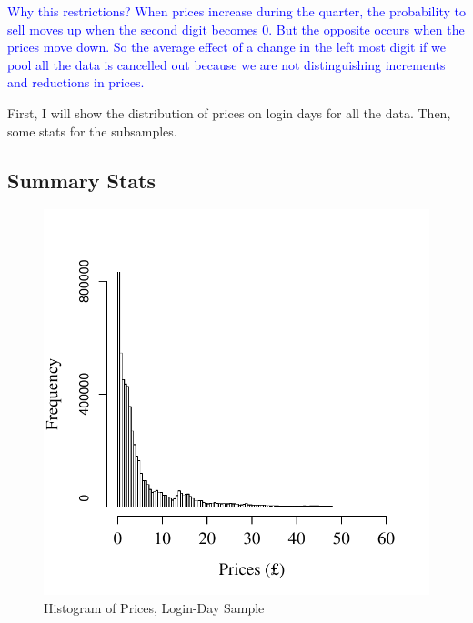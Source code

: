 \textcolor{blue}{Why this restrictions? When prices increase during the quarter, the probability to sell moves up when the second digit becomes 0. But the opposite occurs when the prices move down. So the average effect of a change in the left most digit if we pool all the data is cancelled out because we are not distinguishing increments and reductions in prices.}


	
First, I will show the distribution of prices on login days for all the data. Then, some stats for the subsamples.	
	
	\clearpage
	\subsection{Summary Stats}
	
	\begin{figure}%
		\centering%
		\caption{Histogram of Prices, Login-Day Sample}%
		\label{fig:disposition_interaction_main}%
		\includegraphics[width=.7\textwidth]{figures/prices_hist_login_days.pdf}
	\end{figure}




\clearpage


\begin{econtable}\small
	\caption{Summary Stats}
	\label{tab:stats}
\end{econtable}






